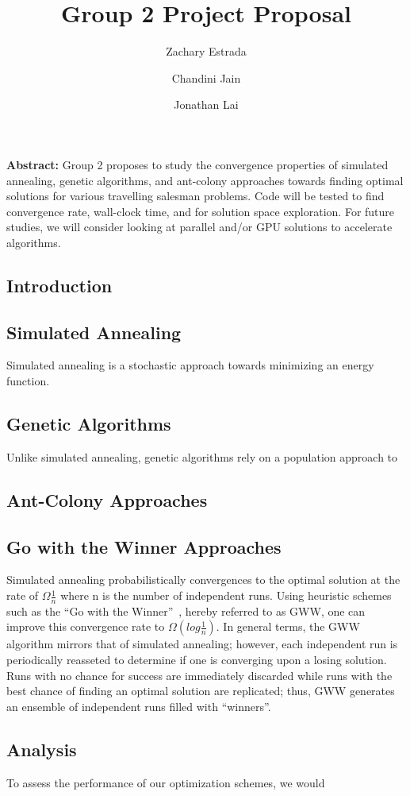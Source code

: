 \documentclass[12pt,onecolumn,notitlepage]{article}
\title{Group 2 Project Proposal}
\author{Zachary Estrada \and Chandini Jain \and Jonathan Lai}
\begin{document}
\maketitle


\textbf{Abstract:} Group 2 proposes to study the convergence
properties of simulated annealing, genetic algorithms, and ant-colony approaches towards
finding optimal solutions for various travelling salesman problems.  Code will be tested
to find convergence rate, wall-clock time, and for solution space exploration.  For future studies,
we will consider looking at parallel and/or GPU solutions to accelerate algorithms.

\subsection{Introduction}

\subsection{Simulated Annealing}
Simulated annealing is a stochastic approach towards minimizing an energy function.

\subsection{Genetic Algorithms}
Unlike simulated annealing, genetic algorithms rely on a population approach to 

\subsection{Ant-Colony Approaches}

\subsection{Go with the Winner Approaches}
Simulated annealing probabilistically convergences to the optimal solution at the rate
 of $\Omega{\frac{1}{n}}$ where n is the number of independent runs.  
Using heuristic schemes such as the ``Go with the Winner''~\cite{Aldous1994gwt}, hereby referred to as GWW, 
one can improve this convergence rate to $\Omega(log \frac{1}{n})$.  In general terms, the GWW algorithm mirrors that of simulated annealing; however, each independent run is periodically reasseted to determine if one is converging upon a losing solution.  Runs with 
no chance for success are immediately discarded while runs with the best chance of finding an optimal solution
are replicated; thus, GWW generates an ensemble of independent runs filled with  ``winners''.  

\subsection{Analysis}
To assess the performance of our optimization schemes, we would




\end{document}

